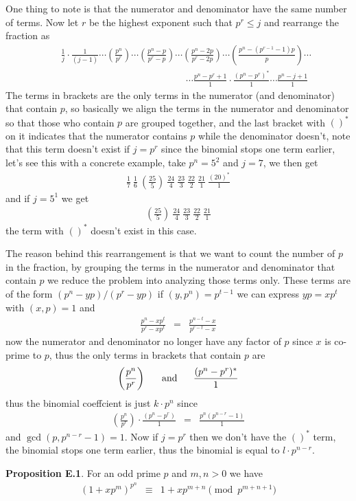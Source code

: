 \documentclass[aps,preprint,preprintnumbers,nofootinbib,showpacs,prd]{revtex4-1}
\newcommand{\nbea}{\begin{eqnarray*}}
\newcommand{\neea}{\end{eqnarray*}}
\begin{document}
One thing to note is that the numerator and denominator have the same number of terms. Now let $r$ be the highest exponent such that $p^r \le j$ and rearrange the fraction as
%
\nbea
&&\frac{1}{j} \cdot \frac{1}{(j-1)} \cdots \left(\frac{p^n}{p^r}\right) \cdots \left(\frac{p^{n}-p}{p^{r}-p}\right) \cdots \left(\frac{p^{n}-2p}{p^{r}-2p}\right) \cdots \left(\frac{p^{n}-(p^{r-1} - 1)p}{p}\right) \cdots \\
&& ~~~~~~~~~~~~~~~~~~~~~~~~~~~~~~~~~~~~~~~~~~~~~~~~~~~~~~~~~~~ \cdots \frac{p^{n}-p^{r} + 1}{1} \cdot \frac{(p^{n}-p^{r})^*}{1} \cdots \frac{p^{n} - j + 1}{1}
\neea
%
The terms in brackets are the only terms in the numerator (and denominator) that contain $p$, so basically we align the terms in the numerator and denominator so that those who contain $p$ are grouped together, and the last bracket with $()^*$ on it indicates that the numerator contains $p$ while the denominator doesn't, note that this term doesn't exist if $j = p^r$ since the binomial stops one term earlier, let's see this with a concrete example, take $p^n = 5^2$ and $j = 7$, we then get
%
\nbea
\frac{1}{7}~\frac{1}{6}~\left(\frac{25}{5}\right)~\frac{24}{4}~\frac{23}{3}~\frac{22}{2}~\frac{21}{1}~\frac{(20)^*}{1}
\neea
%
and if $j = 5^1$ we get
%
\nbea
\left(\frac{25}{5}\right)~\frac{24}{4}~\frac{23}{3}~\frac{22}{2}~\frac{21}{1}
\neea
%
the term with $()^*$ doesn't exist in this case.

The reason behind this rearrangement is that we want to count the number of $p$ in the fraction, by grouping the terms in the numerator and denominator that contain $p$ we reduce the problem into analyzing those terms only. These terms are of the form $(p^n - yp)/(p^r - yp)$ if $(y,p^n) = p^{t-1}$ we can express $yp = xp^t$ with $(x,p) = 1$ and 
%
\nbea
\frac{p^n - xp^t}{p^r - xp^t} & = & \frac{p^{n-t} - x}{p^{r-t} - x}
\neea
%
now the numerator and denominator no longer have any factor of $p$ since $x$ is co-prime to $p$, thus the only terms in brackets that contain $p$ are
%
\nbea
\left(\frac{p^n}{p^r}\right) ~~~~~{\rm and} ~~~~~ \frac{(p^{n}-p^{r})^*}{1}
\neea
%
thus the binomial coeffcient is just $k\cdot p^n$ since
%
\nbea
\left(\frac{p^n}{p^r}\right) \cdot \frac{(p^{n}-p^{r})}{1} & = & \frac{p^n (p^{n-r}-1)}{1}
\neea
%
and $\gcd(p, p^{n-r}-1) = 1$. Now if $j = p^r$ then we don't have the $()^*$ term, the binomial stops one term earlier, thus the binomial is equal to $l\cdot p^{n-r}$.

{\bf Proposition E.1}. For an odd prime $p$ and $m,n > 0$ we have
%
\nbea
(1 + xp^m)^{p^n} & \equiv & 1 + xp^{m+n} \pmod{p^{m+n+1}}
\neea
%
\end{document}
